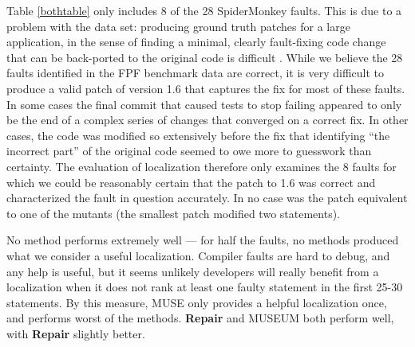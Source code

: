 Table \ref{bothtable} only includes 8 of the 28 SpiderMonkey faults.  This is due to a problem with the data set:  producing ground truth patches for a large application, in the sense of finding a minimal, clearly fault-fixing code change that can be back-ported to the original code is difficult \cite{PLDI13}.  While we believe the 28 faults identified in the FPF benchmark data are correct, it is very difficult to produce a valid patch of version 1.6 that captures the fix for most of these faults.  In some cases the final commit that caused tests to stop failing appeared to only be the end of a complex series of changes that converged on a correct fix.  In other cases, the code was modified so extensively before the fix that identifying ``the incorrect part'' of the original code seemed to owe more to guesswork than certainty.  The evaluation of localization therefore only examines the 8 faults for which we could be reasonably certain that the patch to 1.6 was correct and characterized the fault in question accurately.  In no case was the patch equivalent to one of the mutants (the smallest patch modified two statements).

No method performs extremely well --- for half the faults, no methods produced what we consider a useful localization.   Compiler faults are hard to debug, and any help is useful, but it seems unlikely developers will really benefit from a localization when it does not rank at least one faulty statement in the first 25-30 statements.  By this measure, MUSE only provides a helpful localization once, and performs worst of the methods.  {\bf Repair} and MUSEUM both perform well, with {\bf Repair} slightly better.

